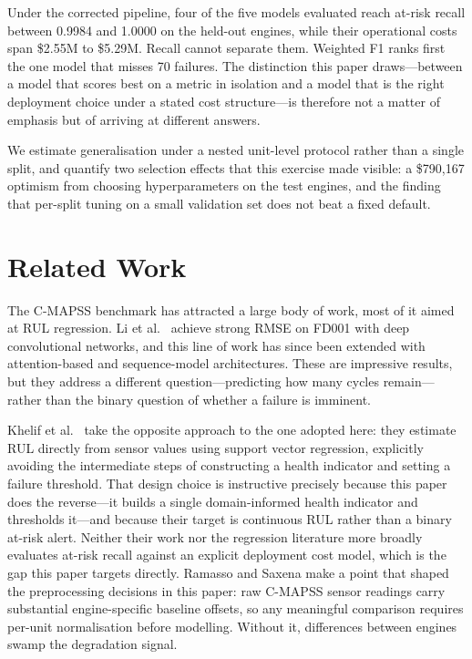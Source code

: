 \documentclass[10pt,twocolumn]{article}
\begin{document}
Under the corrected pipeline, four of the five models evaluated reach at-risk recall
between 0.9984 and 1.0000 on the held-out engines, while their operational costs span
\$2.55M to \$5.29M. Recall cannot separate them. Weighted F1 ranks first the one model
that misses 70 failures. The distinction this paper draws---between a model that scores
best on a metric in isolation and a model that is the right deployment choice under a
stated cost structure---is therefore not a matter of emphasis but of arriving at
different answers.

We estimate generalisation under a nested unit-level protocol rather than a single
split, and quantify two selection effects that this exercise made visible: a \$790,167
optimism from choosing hyperparameters on the test engines, and the finding that
per-split tuning on a small validation set does not beat a fixed default.

\section{Related Work}
\label{sec:related}

The C-MAPSS benchmark \cite{saxena2008damage} has attracted a large body of work, most
of it aimed at RUL regression.
Li et al.\ \cite{li2018remaining} achieve strong RMSE on FD001 with deep convolutional
networks, and this line of work has since been extended with attention-based and
sequence-model architectures.
These are impressive results, but they address a different question---predicting how
many cycles remain---rather than the binary question of whether a failure is imminent.

Khelif et al.\ \cite{khelif2017direct} take the opposite approach to the one adopted
here: they estimate RUL directly from sensor values using support vector regression,
explicitly avoiding the intermediate steps of constructing a health indicator and
setting a failure threshold. That design choice is instructive precisely because this
paper does the reverse---it builds a single domain-informed health indicator and
thresholds it---and because their target is continuous RUL rather than a binary
at-risk alert. Neither their work nor the regression literature more broadly evaluates
at-risk recall against an explicit deployment cost model, which is the gap this paper
targets directly.
Ramasso and Saxena \cite{ramasso2014application} make a point that shaped the
preprocessing decisions in this paper: raw C-MAPSS sensor readings carry substantial
engine-specific baseline offsets, so any meaningful comparison requires per-unit
normalisation before modelling.
Without it, differences between engines swamp the degradation signal.
\end{document}
